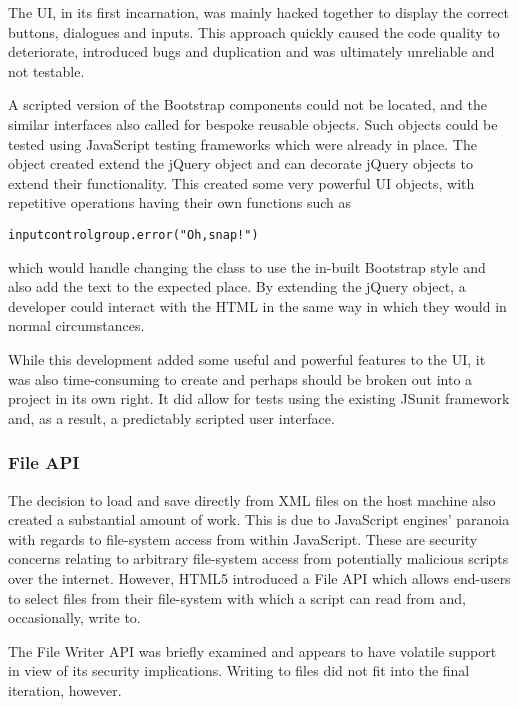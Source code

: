 The UI, in its first incarnation, was mainly hacked together to display the correct buttons, dialogues and inputs. This approach quickly caused the code quality to deteriorate, introduced bugs and duplication and was ultimately unreliable and not testable.

A scripted version of the Bootstrap components could not be located, and the similar interfaces also called for bespoke reusable objects. Such objects could be tested using Java\-Script testing frameworks which were already in place. The object created extend the jQuery object and can decorate jQuery objects to extend their functionality. This created some very powerful UI objects, with repetitive operations having their own functions such as
\begin{alltt}inputcontrolgroup.error("Oh, snap!")\end{alltt}
which would handle changing the class to use the in-built Bootstrap style and also add the text to the expected place. By extending the jQuery object, a developer could interact with the HTML in the same way in which they would in normal circumstances.

While this development added some useful and powerful features to the UI, it was also time-consuming to create and perhaps should be broken out into a project in its own right. It did allow for tests using the existing JSunit framework and, as a result, a predictably scripted user interface.

\subsubsection{File API}
The decision to load and save directly from XML files on the host machine also created a substantial amount of work. This is due to Java\-Script engines' paranoia with regards to file-system access from within Java\-Script. These are security concerns relating to arbitrary file-system access from potentially malicious scripts over the internet. However, HTML5 introduced a File API which allows end-users to select files from their file-system with which a script can read from and, occasionally, write to.

The File Writer API was briefly examined and appears to have volatile support in view of its security implications. Writing to files did not fit into the final iteration, however.